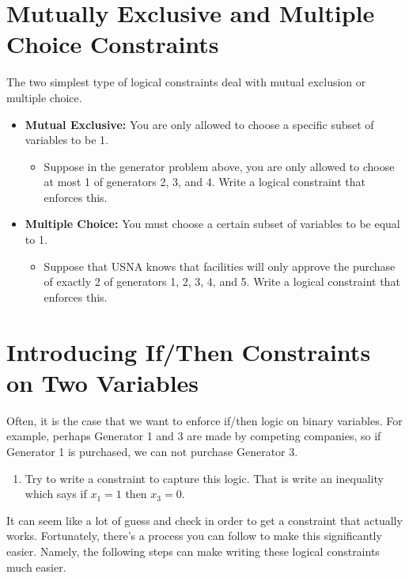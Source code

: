 \documentclass[11pt]{article}
\theoremstyle{definition}
\begin{document}
\section{Mutually Exclusive and Multiple Choice Constraints}

The two simplest type of logical constraints deal with mutual exclusion or multiple choice.
\begin{itemize}
\item \textbf{Mutual Exclusive:} You are only allowed to choose a specific subset of variables to be 1. 
	\begin{itemize}
	\item Suppose in the generator problem above, you are only allowed to choose at most 1 of generators 2, 3, and 4. Write a logical constraint that enforces this. \vspace{2in}
	\end{itemize}
\item \textbf{Multiple Choice:} You must choose a certain subset of variables to be equal to 1.
	\begin{itemize}
	\item Suppose that USNA knows that facilities will only approve the purchase of exactly 2 of generators 1, 2, 3, 4, and 5. Write a logical constraint that enforces this.
	\end{itemize}
\end{itemize}

\newpage


\section{Introducing If/Then Constraints on Two Variables}

Often, it is the case that we want to enforce if/then logic on binary variables. For example, perhaps Generator 1 and 3 are made by competing companies, so if Generator 1 is purchased, we can not purchase Generator 3.

\begin{enumerate}[resume]
\item Try to write a constraint to capture this logic. That is write an inequality which says if $x_1 = 1$ then $x_3 = 0$. \vspace{2in}
\end{enumerate}

It can seem like a lot of guess and check in order to get a constraint that actually works. Fortunately, there's a process you can follow to make this significantly easier. Namely, the following steps can make writing these logical constraints much easier.
\end{document}
